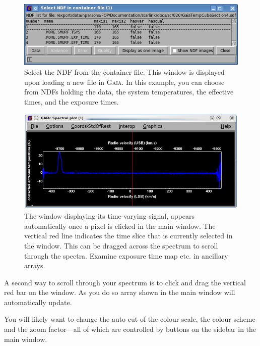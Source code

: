 \documentclass[11pt,oneside,chapters]{starlink}
\begin{document}
\begin{figure}[h!]
\begin{center}
\includegraphics[width=0.7\linewidth]{sc20_gaia3}
\caption[\gaia\ select NDF in container file]{\label{fig:ndfgaia}
  Select the NDF from the container file.  This window is displayed upon
  loading a new file in \textsc{Gaia}.  In this example, you can choose
  from NDFs holding the data, the system temperatures, the effective
  times, and the exposure times.}
\end{center}
\end{figure}


\begin{figure}[h!]
\begin{center}
\includegraphics[width=0.7\linewidth]{sc20_gaia2}
\caption[Spectral plot window with \gaia.]{\label{fig:gaia2}
  The  window displaying its time-varying
  signal, appears automatically once a pixel is clicked in the main window.
  The vertical red line indicates the time slice that is currently selected
  in the  window. This can be
  dragged across the spectrum to scroll through the spectra. Examine exposure
  time map etc. in ancillary arrays.}
\end{center}
\end{figure}



A second way to scroll through your spectrum is to click and drag the
vertical red bar on the  window. As you do so
array shown in the main window will automatically update.

You will likely want to change the auto cut of the colour scale, the
colour scheme and the zoom factor---all of which are controlled by
buttons on the sidebar in the main window.
\end{document}
